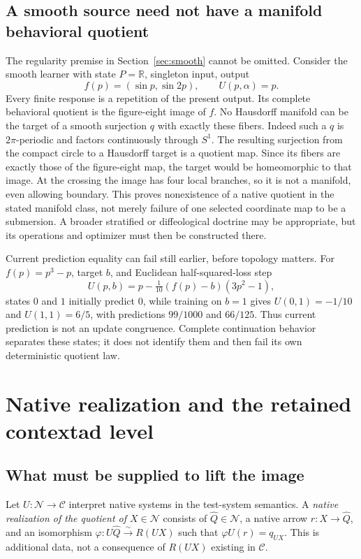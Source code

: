 \documentclass[11pt]{article}
\theoremstyle{definition}
\theoremstyle{remark}\newtheorem{remark}[theorem]{Remark}
\newcommand{\C}{\mathcal C}
\newcommand{\N}{\mathcal N}
\newcommand{\R}{\mathbb R}
\begin{document}
\subsection{A smooth source need not have a manifold behavioral quotient}
The regularity premise in Section~\ref{sec:smooth} cannot be omitted.
Consider the smooth learner with state $P=\R$, singleton input, output
\[
 f(p)=(\sin p,\sin 2p),\qquad U(p,\alpha)=p.
\]
Every finite response is a repetition of the present output. Its complete
behavioral quotient is the figure-eight image of $f$. No Hausdorff manifold
can be the target of a smooth surjection $q$ with exactly these fibers.
Indeed such a $q$ is $2\pi$-periodic and factors continuously through $S^1$.
The resulting surjection from the compact circle to a Hausdorff target is
a quotient map. Since its fibers are exactly those of the figure-eight map,
the target would be homeomorphic to that image. At the crossing the image
has four local branches, so it is not a manifold, even allowing boundary.
This proves nonexistence of a native quotient in the stated manifold class,
not merely failure of one selected coordinate map to be a submersion.
A broader stratified or diffeological doctrine may be appropriate, but its
operations and optimizer must then be constructed there.

Current prediction equality can fail still earlier, before topology matters.
For $f(p)=p^3-p$, target $b$, and Euclidean half-squared-loss step
\[
 U(p,b)=p-\tfrac1{10}(f(p)-b)(3p^2-1),
\]
states $0$ and $1$ initially predict $0$, while training on $b=1$ gives
$U(0,1)=-1/10$ and $U(1,1)=6/5$, with predictions $99/1000$ and $66/125$.
Thus current prediction is not an update congruence. Complete continuation
behavior separates these states; it does not identify them and then fail
its own deterministic quotient law.


\section{Native realization and the retained contextad level}
\subsection{What must be supplied to lift the image}
Let $U:\N\to\C$ interpret native systems in the test-system semantics.
A \emph{native realization of the quotient of $X\in\N$} consists of
$\widehat Q\in\N$, a native arrow $r:X\to\widehat Q$, and an
isomorphism $\varphi:U\widehat Q\xrightarrow{\sim}R(UX)$ such that
$\varphi U(r)=q_{UX}$. This is additional data, not a consequence of
$R(UX)$ existing in $\C$.
\end{document}
